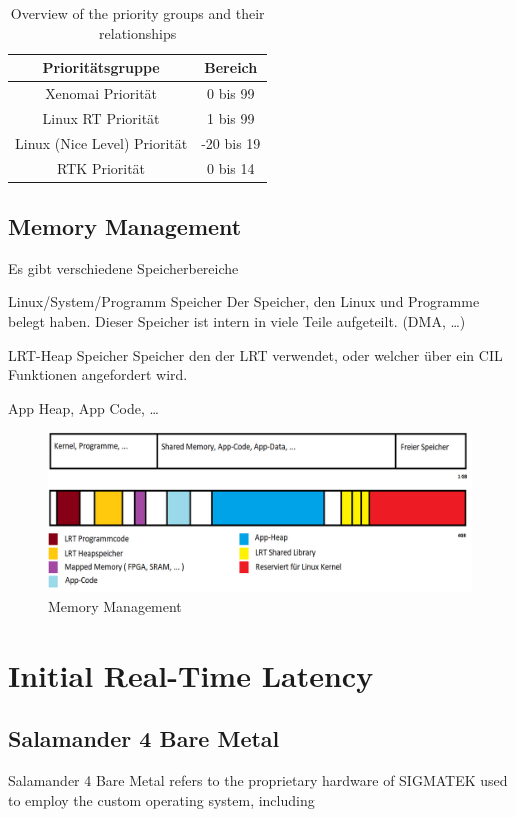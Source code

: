 \documentclass[MMR,Master,english]{twbook}
\begin{document}
\begin{table}[ht]
	\centering
	\caption{Overview of the priority groups and their relationships}
	\label{tab:priorities}
	\begin{tabular}{|c|c|}
		\hline
		\textbf{Prioritätsgruppe}    & \textbf{Bereich} \\ \hline
		Xenomai Priorität            & 0 bis 99         \\ \hline
		Linux RT Priorität           & 1 bis 99         \\ \hline
		Linux (Nice Level) Priorität & -20 bis 19       \\ \hline
		RTK Priorität                & 0 bis 14         \\ \hline
	\end{tabular}
\end{table}
\clearpage
\section{Memory Management}
Es gibt verschiedene Speicherbereiche

Linux/System/Programm Speicher
Der Speicher, den Linux und Programme belegt haben.
Dieser Speicher ist intern in viele Teile aufgeteilt. (DMA, …)

LRT-Heap Speicher
Speicher den der LRT verwendet, oder welcher über ein CIL Funktionen
angefordert wird.

App Heap, App Code, …


\begin{figure}[H]
	\centering
	\includegraphics[width=0.8\columnwidth]{img/RAM_Memory_management.png}
	\caption[Memory Management]{Memory Management}
	\label{fig:memory_management}
\end{figure}

\clearpage

\chapter{Initial Real-Time Latency}\label{cha:initial-real-time-latency}

\clearpage
\section{Salamander 4 Bare Metal}
Salamander 4 Bare Metal refers to the proprietary hardware of SIGMATEK used to employ the custom operating system, including
\end{document}
